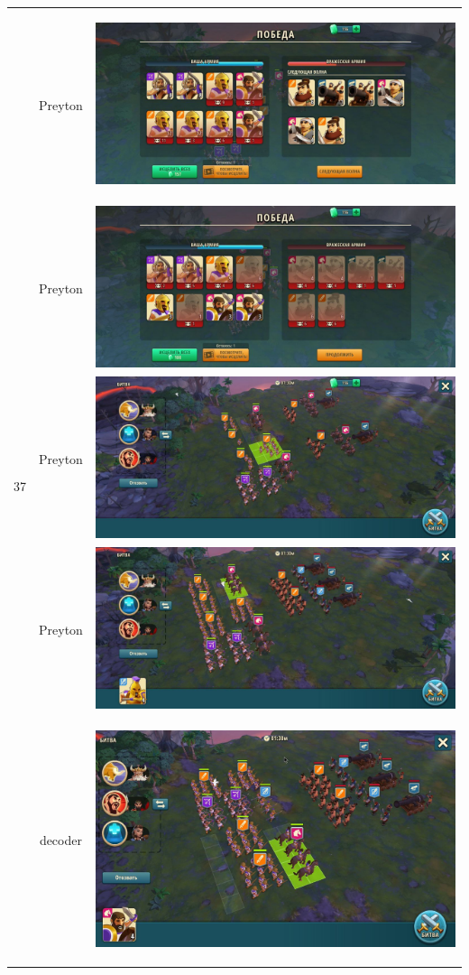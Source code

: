 \begin{longtable}{|c|c|c|}
	\hline
	\multirow{12}{*}{37} & Preyton &
	\hypertarget{fight37}{\includegraphics[width=0.75\linewidth]{./parts/media/TreasureHunt/37/Preyton/37_1.jpg}} \\
	& Preyton &
	\includegraphics[width=0.75\linewidth]{./parts/media/TreasureHunt/37/Preyton/37_2.jpg} \\
	& Preyton &
	\includegraphics[width=0.75\linewidth]{./parts/media/TreasureHunt/37/Preyton/37.2.jpg} \\
	& Preyton &
	\includegraphics[width=0.75\linewidth]{./parts/media/TreasureHunt/37/Preyton/37.1.jpg} \\
	\hline
	\multirow{12}{*}{37} & decoder &
	\hypertarget{fight37}{\includegraphics[width=0.75\linewidth]{./parts/media/TreasureHunt/37/decoder/photo_2022-04-14_12-36-24.jpg}} \\

\end{longtable}

